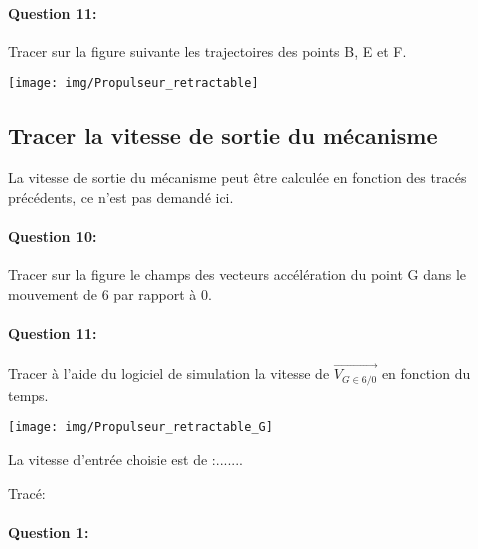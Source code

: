 \paragraph{Question 11:} Tracer sur la figure suivante les trajectoires des points B, E et F.

\vspace{1cm}

\texttt{[image: img/Propulseur\_retractable]}

\subsection{Tracer la vitesse de sortie du mécanisme}

La vitesse de sortie du mécanisme peut être calculée en fonction des tracés précédents, ce n'est pas demandé ici.

\paragraph{Question 10:} Tracer sur la figure le champs des vecteurs accélération du point G dans le mouvement de 6 par rapport à 0.

\begin{minipage}{0.45\linewidth}
\paragraph{Question 11:} Tracer à l'aide du logiciel de simulation la vitesse de $\overrightarrow{V_{G\in 6/0}}$ en fonction du temps.

\end{minipage}
\hfill
\begin{minipage}{0.45\linewidth}
\texttt{[image: img/Propulseur\_retractable\_G]}
\end{minipage}

\newpage

La vitesse d'entrée choisie est de :.......

Tracé:
\vspace{10cm}




\pagestyle{correction}\setcounter{section}{0}

\paragraph{Question 1:}
